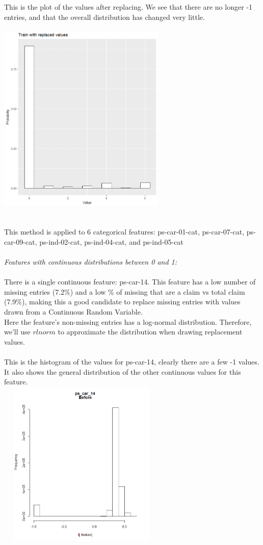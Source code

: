 \documentclass[fleqn,10pt]{SelfArx} %
\begin{document}
This is the plot of the values after replacing. We see that there are no longer -1 entries, and that the overall distribution has changed very little.\\
\includegraphics[width=8cm, height=10cm]{ex_finished} \\
\\ This method is applied to 6 categorical features: ps-car-01-cat, ps-car-07-cat, ps-car-09-cat, ps-ind-02-cat, ps-ind-04-cat, and ps-ind-05-cat \\
\\
\textit{Features with continuous distributions between 0 and 1:}\\
\\
There is a single continuous feature: ps-car-14. This feature has a low number of missing entries (7.2\%) and a low \% of missing that are a claim vs total claim (7.9\%), making this a good candidate to replace missing entries with values drawn from a Continuous Random Variable.\\
Here the feature's non-missing entries has a log-normal distribution. Therefore, we'll use $rlnorm$ to approximate the distribution when drawing replacement values.\\
\\
This is the histogram of the values for ps-car-14, clearly there are a few -1 values. It also shows the general distribution of the other continuous values for this feature.\\ 
\includegraphics[width=8cm, height=8cm]{cont-before} \\
\end{document}
